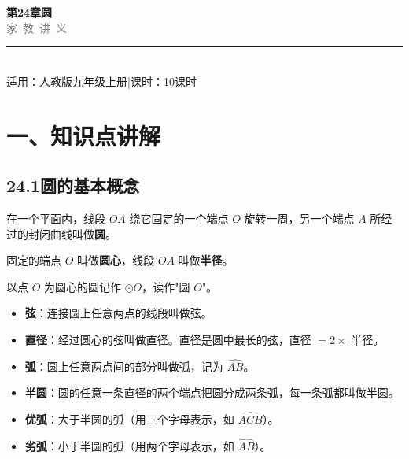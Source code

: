 \documentclass[12pt, a4paper]{ctexart}
\begin{document}
\begin{center}
{\Huge\bfseries\textcolor{mainblue}{第24章\quad 圆}}\\[12pt]
{\Large\textcolor{gray}{家\ 教\ 讲\ 义}}\\[8pt]
\rule{0.6\textwidth}{1pt}\\[8pt]
{\normalsize 适用：人教版\quad 九年级上册\quad |\quad 课时：10课时}
\end{center}
\vspace{10pt}

\section*{\textcolor{mainblue}{一、知识点讲解}}

\subsection*{24.1\quad 圆的基本概念}

\begin{knowledgebox}[圆的定义]
在一个平面内，线段 $OA$ 绕它固定的一个端点 $O$ 旋转一周，另一个端点 $A$ 所经过的封闭曲线叫做\textbf{圆}。

固定的端点 $O$ 叫做\textbf{圆心}，线段 $OA$ 叫做\textbf{半径}。

以点 $O$ 为圆心的圆记作 $\odot O$，读作"圆 $O$"。
\end{knowledgebox}

\begin{knowledgebox}[弦与直径]
\begin{itemize}[nosep]
  \item \textbf{弦}：连接圆上任意两点的线段叫做弦。
  \item \textbf{直径}：经过圆心的弦叫做直径。直径是圆中最长的弦，直径 $= 2 \times$ 半径。
\end{itemize}
\end{knowledgebox}

\begin{knowledgebox}[弧]
\begin{itemize}[nosep]
  \item \textbf{弧}：圆上任意两点间的部分叫做弧，记为 $\widehat{AB}$。
  \item \textbf{半圆}：圆的任意一条直径的两个端点把圆分成两条弧，每一条弧都叫做半圆。
  \item \textbf{优弧}：大于半圆的弧（用三个字母表示，如 $\widehat{ACB}$）。
  \item \textbf{劣弧}：小于半圆的弧（用两个字母表示，如 $\widehat{AB}$）。
\end{itemize}
\end{knowledgebox}
\end{document}
